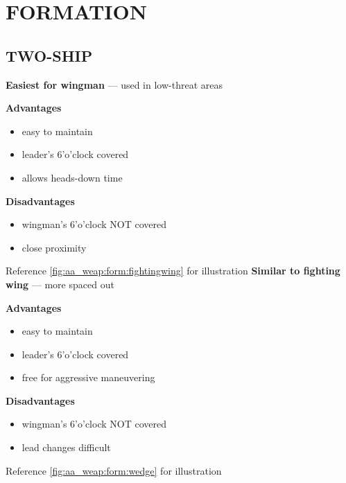 \section{FORMATION}

\subsection{TWO-SHIP}

\begin{tcoloritemize}
    \textbf{Easiest for wingman} --- used in low-threat areas

    \medskip

    \textbf{Advantages}
    \begin{itemize}
        \item easy to maintain
        \item leader's 6'o'clock covered
        \item allows heads-down time
    \end{itemize}

    \textbf{Disadvantages}
    \begin{itemize}
        \item wingman's 6'o'clock NOT covered
        \item close proximity
    \end{itemize}

    Reference \cref{fig:aa_weap:form:fightingwing} for illustration
    \blueitem[Wedge]
    \textbf{Similar to fighting wing} --- more spaced out
    
    \medskip

    \textbf{Advantages}
    \begin{itemize}
        \item easy to maintain
        \item leader's 6'o'clock covered
        \item free for aggressive maneuvering
    \end{itemize}

    \textbf{Disadvantages}
    \begin{itemize}
        \item wingman's 6'o'clock NOT covered
        \item lead changes difficult
    \end{itemize}

    Reference \cref{fig:aa_weap:form:wedge} for illustration
\end{tcoloritemize}

